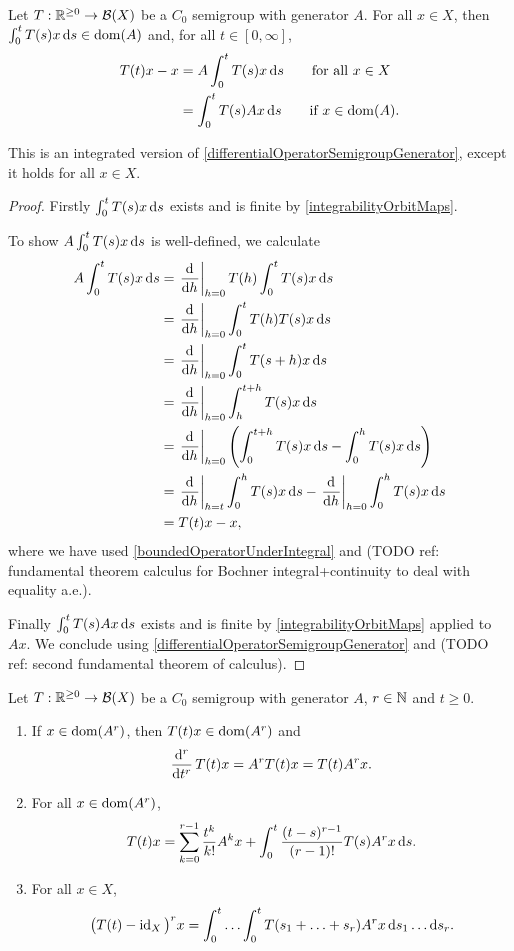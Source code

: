 \begin{proposition} \label{integralOperatorSemigroupGenerator}
Let $T: \R^{\geq 0}\to \Bounded(X)$ be a $C_0$ semigroup with generator $A$. For all $x\in X$, then $\int_0^t T(s)x\diff{s}\in\dom(A)$ and, for all $t\in [0,\infty]$,
\begin{align*}
T(t)x - x &= A\int_0^t T(s)x\diff{s} \qquad\text{for all $x\in X$} \\
&= \int_0^t T(s)Ax\diff{s} \qquad\text{if $x\in\dom(A)$}.
\end{align*}
\end{proposition}
This is an integrated version of \ref{differentialOperatorSemigroupGenerator}, except it holds for all $x\in X$.
\begin{proof}
Firstly $\int_0^t T(s)x\diff{s}$ exists and is finite by \ref{integrabilityOrbitMaps}.

To show $A\int_0^t T(s)x\diff{s}$ is well-defined, we calculate
\begin{align*}
A\int_0^t T(s)x\diff{s} &= \left.\dod{}{h}\right|_{h=0}T(h)\int_0^t T(s)x\diff{s} \\
&= \left.\dod{}{h}\right|_{h=0}\int_0^t T(h)T(s)x\diff{s} \\
&= \left.\dod{}{h}\right|_{h=0}\int_0^t T(s+h)x\diff{s} \\
&= \left.\dod{}{h}\right|_{h=0}\int_h^{t+h} T(s)x\diff{s} \\
&= \left.\dod{}{h}\right|_{h=0}\left(\int_0^{t+h} T(s)x\diff{s}-\int_0^{h} T(s)x\diff{s}\right) \\
&= \left.\dod{}{h}\right|_{h=t}\int_0^{h} T(s)x\diff{s}-\left.\dod{}{h}\right|_{h=0}\int_0^{h} T(s)x\diff{s} \\
&= T(t)x - x,
\end{align*}
where we have used \ref{boundedOperatorUnderIntegral} and (TODO ref: fundamental theorem calculus for Bochner integral+continuity to deal with equality a.e.).

Finally $\int_0^t T(s)Ax\diff{s}$ exists and is finite by \ref{integrabilityOrbitMaps} applied to $Ax$. We conclude using \ref{differentialOperatorSemigroupGenerator} and (TODO ref: second fundamental theorem of calculus).
\end{proof}
\begin{corollary}
Let $T: \R^{\geq 0}\to \Bounded(X)$ be a $C_0$ semigroup with generator $A$, $r\in\N$ and $t\geq 0$.
\begin{enumerate}
\item If $x\in \dom(A^r)$, then $T(t)x\in\dom(A^r)$ and
\[ \dod[r]{}{t}T(t)x = A^rT(t)x = T(t)A^r x. \]
\item For all $x\in\dom(A^r)$,
\[ T(t)x = \sum_{k=0}^{r-1}\frac{t^k}{k!}A^kx + \int_0^t \frac{(t-s)^{r-1}}{(r-1)!}T(s)A^rx \diff{s}. \]
\item For all $x\in X$,
\[ \big(T(t) - \id_X\big)^rx = \int_0^t\ldots \int_0^t T(s_1 +\ldots +s_r)A^rx \diff{s_1}\ldots \diff{s_r}. \]
\end{enumerate}
\end{corollary}

